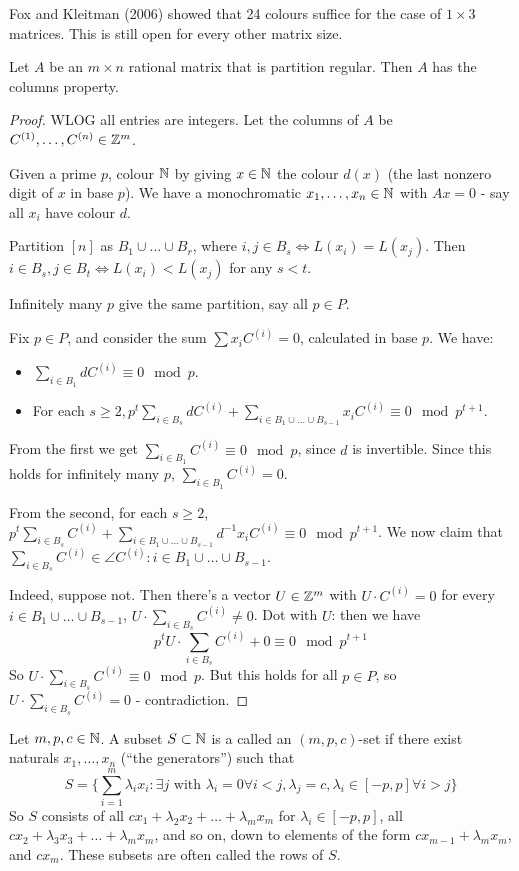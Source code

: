 \documentclass[10pt,a4paper]{article}
\begin{document}
Fox and Kleitman (2006) showed that 24 colours suffice for the case of $1 \times 3$ matrices. This is still open for every other matrix size.

\begin{proposition}
  Let $A$ be an $m \times n$ rational matrix that is partition regular. Then $A$ has the columns property.
\end{proposition}
\begin{proof}
  WLOG all entries are integers. Let the columns of $A$ be $C^{(1)}, \ldots, C^{(n)} \in \mathbb{Z}^m$.

  Given a prime $p$, colour $\mathbb{N}$ by giving $x \in \mathbb{N}$ the colour $d(x)$ (the last nonzero digit of $x$ in base $p$). We have a monochromatic $x_1, \ldots, x_n \in \mathbb{N}$ with $Ax = 0$ - say all $x_i$ have colour $d$.

  Partition $[n]$ as $B_1 \cup \ldots \cup B_r$, where $i,j \in B_s \iff L(x_i) = L(x_j)$. Then $i \in B_s, j \in B_t \iff L(x_i) < L(x_j)$ for any $s < t$.

  Infinitely many $p$ give the same partition, say all $p \in P$.

  Fix $p \in P$, and consider the sum $\sum x_i C^{(i)} = 0$, calculated in base $p$. We have:
  \begin{itemize}
    \item $\sum_{i \in B_1} dC^{(i)} \equiv 0 \mod p$.
    \item For each $s \geq 2, p^t \sum_{i \in B_s} dC^{(i)} + \sum_{i \in B_1 \cup \ldots \cup B_{s-1}} x_i C^{(i)} \equiv 0 \mod p^{t+1}$.
  \end{itemize}
  From the first we get $\sum_{i \in B_1}C^{(i)} \equiv 0 \mod p$, since $d$ is invertible. Since this holds for infinitely many $p$, $\sum_{i \in B_1}C^{(i)} = 0$.

  From the second, for each $s \geq 2$, $p^t \sum_{i \in B_s} C^{(i)} + \sum_{i \in B_1 \cup \ldots \cup B_{s-1}} d^{-1} x_i C^{(i)} \equiv 0 \mod p^{t+1}$. We now claim that $\sum_{i \in B_s}C^{(i)} \in \angle{C^{(i)}: i \in B_1\cup \ldots \cup B_{s-1}}$.

  Indeed, suppose not. Then there's a vector $U \in \mathbb{Z}^m$ with $U \cdot C^{(i)} = 0$ for every $i \in B_1 \cup \ldots \cup B_{s-1}$, $U \cdot \sum_{i \in B_s}C^{(i)} \neq 0$. Dot with $U$: then we have
  \[p^t U \cdot \sum_{i \in B_s}C^{(i)} + 0 \equiv 0 \mod p^{t+1}\]
  So $U \cdot \sum_{i \in B_s}C^{(i)} \equiv 0 \mod p$. But this holds for all $p \in P$, so $U \cdot \sum_{i \in B_s}C^{(i)} = 0$ - contradiction.
\end{proof}
Let $m,p,c \in \mathbb{N}$. A subset $S \subset \mathbb{N}$ is a called  an $(m,p,c)$-set if there exist naturals $x_1, \ldots, x_n$ (``the generators'') such that
\[S = \{\sum_{i=1}^m \lambda_i x_i: \exists j\text{ with }\lambda_i = 0 \forall i < j, \lambda_j =c, \lambda_i \in [-p,p] \forall i >j\}\]
So $S$ consists of all $cx_1 + \lambda_2 x_2 + \ldots + \lambda_m x_m$ for $\lambda_i \in [-p,p]$, all $cx_2 + \lambda_3 x_3 + \ldots + \lambda_m x_m$, and so on, down to elements of the form $cx_{m-1}+\lambda_m x_m$, and $cx_m$. These subsets are often called the rows of $S$.
\end{document}
